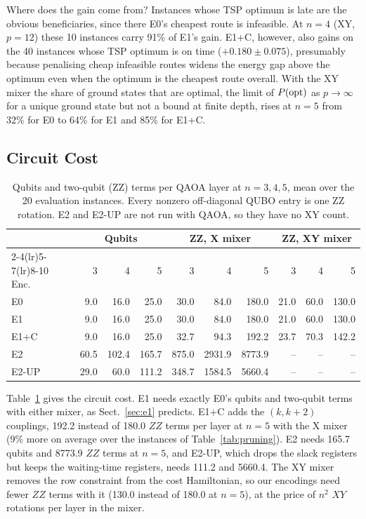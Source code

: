 Where does the gain come from? Instances whose TSP optimum is late are the obvious beneficiaries,
since there E0's cheapest route is infeasible. At $n=4$ (XY, $p=12$) these 10 instances carry
91\% of E1's gain. E1+C, however, also gains on the 40 instances whose TSP optimum is on time
($+0.180\pm0.075$), presumably because penalising cheap infeasible routes widens the energy gap
above the optimum even when the optimum is the cheapest route overall. With the XY mixer the
share of ground states that are optimal, the limit of $P(\mathrm{opt})$ as $p\to\infty$ for a unique ground
state but not a bound at finite depth, rises at $n=5$ from 32\% for E0 to 64\% for E1 and 85\% for
E1+C.

\subsection{Circuit Cost}\label{sec:res-cost}
\begin{table}[tb]
\caption{Qubits and two-qubit (ZZ) terms per QAOA layer at $n=3,4,5$, mean over the 20
evaluation instances. Every nonzero off-diagonal QUBO entry is one ZZ rotation. E2 and E2-UP are
not run with QAOA, so they have no XY count.}\label{tab:resources}
\centering\small\setlength{\tabcolsep}{4pt}
\begin{tabular}{lrrrrrrrrr}
\toprule
 & \multicolumn{3}{c}{Qubits} & \multicolumn{3}{c}{ZZ, X mixer} & \multicolumn{3}{c}{ZZ, XY mixer}\\
\cmidrule(lr){2-4}\cmidrule(lr){5-7}\cmidrule(lr){8-10}
Enc. & 3 & 4 & 5 & 3 & 4 & 5 & 3 & 4 & 5\\
\midrule
E0    &  9.0 &  16.0 &  25.0 &  30.0 &   84.0 &  180.0 & 21.0 & 60.0 & 130.0\\
E1    &  9.0 &  16.0 &  25.0 &  30.0 &   84.0 &  180.0 & 21.0 & 60.0 & 130.0\\
E1+C  &  9.0 &  16.0 &  25.0 &  32.7 &   94.3 &  192.2 & 23.7 & 70.3 & 142.2\\
E2    & 60.5 & 102.4 & 165.7 & 875.0 & 2931.9 & 8773.9 & -- & -- & --\\
E2-UP & 29.0 &  60.0 & 111.2 & 348.7 & 1584.5 & 5660.4 & -- & -- & --\\
\bottomrule
\end{tabular}
\end{table}

Table~\ref{tab:resources} gives the circuit cost. E1 needs exactly
E0's qubits and two-qubit terms with either mixer, as Sect.~\ref{sec:e1} predicts. E1+C adds the
$(k,k+2)$ couplings, 192.2 instead of 180.0 $ZZ$ terms per layer at $n=5$ with the X mixer (9\%
more on average over the instances of Table~\ref{tab:pruning}). E2 needs 165.7 qubits and 8773.9
$ZZ$ terms at $n=5$, and E2-UP, which drops the slack registers but keeps the waiting-time
registers, needs 111.2 and 5660.4. The XY mixer removes the row constraint from the cost
Hamiltonian, so our encodings need fewer $ZZ$ terms with it (130.0 instead of 180.0 at $n=5$), at
the price of $n^2$ $XY$ rotations per layer in the mixer.

